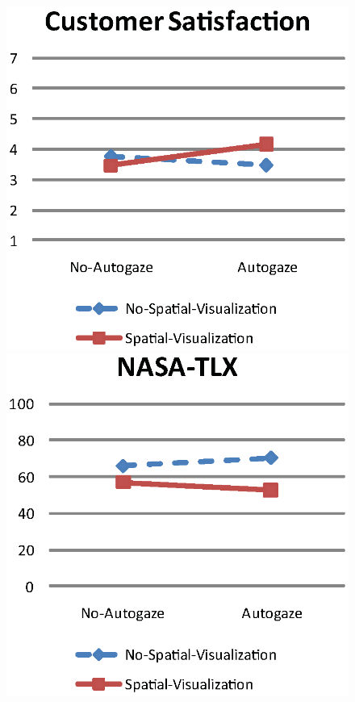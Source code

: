 \documentclass[a4paper, 10pt, conference]{ieeeconf}     %
\begin{document}
\begin{figure}[t]
	\centering
		\includegraphics[keepaspectratio, scale= 0.5]{figs/customerSatisfactionFinal2}
		\includegraphics[keepaspectratio, scale= 0.5]{figs/nasaTlxFinal}

\end{figure}
\end{document}
